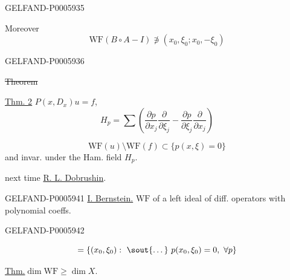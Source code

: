 \begin{GelfandAdjacentEvidence}{GELFAND-P000593}{5}


Moreover
\[
\mathrm{WF}(B\circ A-I)\not\ni(x_0,\xi_0;x_0,-\xi_0)
\]
\end{GelfandAdjacentEvidence}
\begin{GelfandAdjacentEvidence}{GELFAND-P000593}{6}


\sout{Theorem}

\underline{\underline{Thm. 2}} \(P(x,D_x)u=f\),
\[
H_p=\sum\left(
\frac{\partial p}{\partial x_j}\frac{\partial}{\partial\xi_j}
-\frac{\partial p}{\partial\xi_j}\frac{\partial}{\partial x_j}\right)
\]
\end{GelfandAdjacentEvidence}

\[
\mathrm{WF}(u)\setminus\mathrm{WF}(f)\subset\{p(x,\xi)=0\}
\]
and invar. under the Ham. field \(H_p\).

next time \underline{R. L. Dobrushin}.


\begin{GelfandAdjacentEvidence}{GELFAND-P000594}{1}
\underline{I. Bernstein.}\qquad
\(\mathrm{WF}\) of a left ideal of diff. operators with polynomial coeffs.
\end{GelfandAdjacentEvidence}
\begin{GelfandAdjacentEvidence}{GELFAND-P000594}{2}

\[
=\{(x_0,\xi_0):\ \text{\sout{\textellipsis{}}}\ p(x_0,\xi_0)=0,\ \forall p\}
\]
\end{GelfandAdjacentEvidence}


\underline{Thm.}\quad \(\dim\mathrm{WF}\ge\dim X\).


